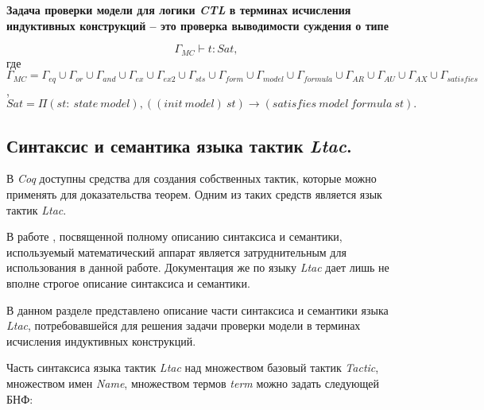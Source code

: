 \documentclass[12pt]{article}
\begin{document}
\textbf{Задача проверки модели для логики \textit{CTL} в терминах исчисления индуктивных конструкций -- это проверка выводимости суждения о типе}

$$\Gamma_{MC} \vdash t: Sat,$$
где
$\Gamma_{MC}=\Gamma_{eq} \cup \Gamma_{or} \cup \Gamma_{and} \cup \Gamma_{ex} \cup \Gamma_{ex2} \cup \Gamma_{sts} \cup \Gamma_{form}\cup \Gamma_{model} \cup \Gamma_{formula} \cup \Gamma_{AR} \cup \Gamma_{AU} \cup \Gamma_{AX} \cup \Gamma_{satisfies}$,
$Sat= \Pi (st:\ state\ model), ((init\ model)\ st) \xrightarrow{} (satisfies\ model\ formula\ st).$


\subsection{Синтаксис и семантика языка тактик \textit{Ltac}.}

В \textit{Coq} доступны средства для создания собственных тактик, которые можно применять для доказательства теорем. Одним из таких средств является язык тактик \textit{Ltac}. 

В работе \cite{LtacFull}, посвященной  полному описанию синтаксиса и семантики, используемый математический аппарат является затруднительным для использования в данной работе. Документация же по языку \textit{Ltac} \cite{lib} дает лишь не вполне строгое описание синтаксиса и семантики.

В данном разделе представлено описание части синтаксиса и семантики языка \textit{Ltac}, потребовавшейся для решения задачи проверки модели в терминах исчисления индуктивных конструкций.

Часть синтаксиса  языка тактик \textit{Ltac} над множеством базовый тактик \textit{Tactic}, множеством имен \textit{Name}, множеством термов \textit{term} можно задать следующей БНФ:
\end{document}
